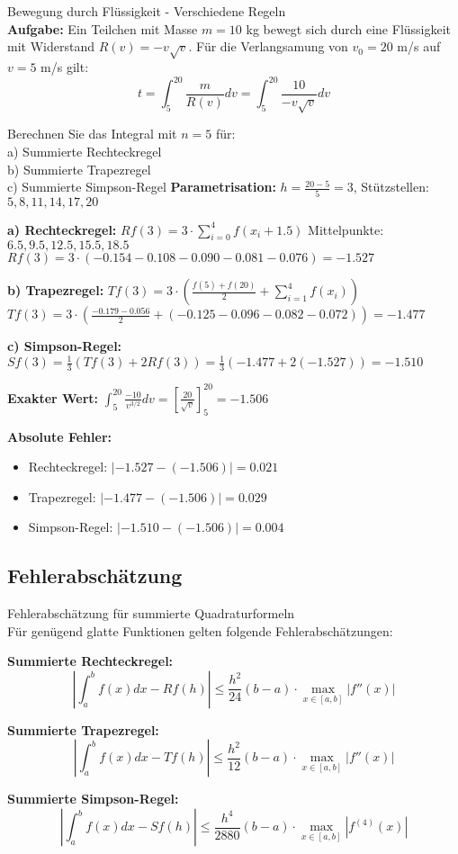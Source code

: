 \begin{example2}{Bewegung durch Flüssigkeit - Verschiedene Regeln}\\
\textbf{Aufgabe:} Ein Teilchen mit Masse $m = 10$ kg bewegt sich durch eine Flüssigkeit mit Widerstand $R(v) = -v\sqrt{v}$. Für die Verlangsamung von $v_0 = 20$ m/s auf $v = 5$ m/s gilt:
$$t = \int_5^{20} \frac{m}{R(v)} dv = \int_5^{20} \frac{10}{-v\sqrt{v}} dv$$

Berechnen Sie das Integral mit $n = 5$ für:\\
a) Summierte Rechteckregel\\
b) Summierte Trapezregel  \\
c) Summierte Simpson-Regel
\tcblower
\textbf{Parametrisation:} $h = \frac{20-5}{5} = 3$, Stützstellen: $5, 8, 11, 14, 17, 20$

\textbf{a) Rechteckregel:} $Rf(3) = 3 \cdot \sum_{i=0}^{4} f(x_i + 1.5)$
Mittelpunkte: $6.5, 9.5, 12.5, 15.5, 18.5$
$Rf(3) = 3 \cdot (-0.154 - 0.108 - 0.090 - 0.081 - 0.076) = -1.527$

\textbf{b) Trapezregel:} $Tf(3) = 3 \cdot \left(\frac{f(5) + f(20)}{2} + \sum_{i=1}^{4} f(x_i)\right)$
$Tf(3) = 3 \cdot \left(\frac{-0.179 - 0.056}{2} + (-0.125 - 0.096 - 0.082 - 0.072)\right) = -1.477$

\textbf{c) Simpson-Regel:} $Sf(3) = \frac{1}{3}(Tf(3) + 2Rf(3)) = \frac{1}{3}(-1.477 + 2(-1.527)) = -1.510$

\textbf{Exakter Wert:} $\int_5^{20} \frac{-10}{v^{3/2}} dv = \left[\frac{20}{\sqrt{v}}\right]_5^{20} = -1.506$

\textbf{Absolute Fehler:}
\begin{itemize}
    \item Rechteckregel: $|{-1.527} - ({-1.506})| = 0.021$
    \item Trapezregel: $|{-1.477} - ({-1.506})| = 0.029$  
    \item Simpson-Regel: $|{-1.510} - ({-1.506})| = 0.004$
\end{itemize}
\end{example2}

\subsection{Fehlerabschätzung}

\begin{theorem}{Fehlerabschätzung für summierte Quadraturformeln}\\
Für genügend glatte Funktionen gelten folgende Fehlerabschätzungen:

\textbf{Summierte Rechteckregel:}
$$\left|\int_a^b f(x) dx - Rf(h)\right| \leq \frac{h^2}{24}(b-a) \cdot \max_{x \in [a,b]} |f''(x)|$$

\textbf{Summierte Trapezregel:}
$$\left|\int_a^b f(x) dx - Tf(h)\right| \leq \frac{h^2}{12}(b-a) \cdot \max_{x \in [a,b]} |f''(x)|$$

\textbf{Summierte Simpson-Regel:}
$$\left|\int_a^b f(x) dx - Sf(h)\right| \leq \frac{h^4}{2880}(b-a) \cdot \max_{x \in [a,b]} |f^{(4)}(x)|$$
\end{theorem}

